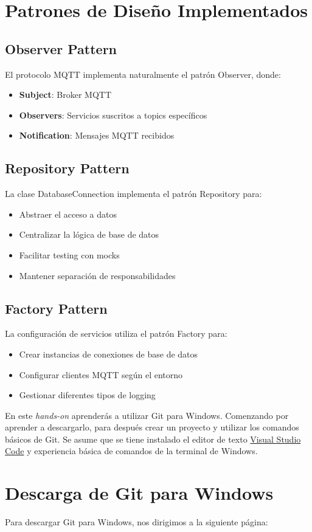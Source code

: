 \section{Patrones de Diseño Implementados}

\subsection{Observer Pattern}
El protocolo MQTT implementa naturalmente el patrón Observer, donde:
\begin{itemize}[noitemsep]
    \item \textbf{Subject}: Broker MQTT
    \item \textbf{Observers}: Servicios suscritos a topics específicos
    \item \textbf{Notification}: Mensajes MQTT recibidos
\end{itemize}

\subsection{Repository Pattern}
La clase DatabaseConnection implementa el patrón Repository para:
\begin{itemize}[noitemsep]
    \item Abstraer el acceso a datos
    \item Centralizar la lógica de base de datos
    \item Facilitar testing con mocks
    \item Mantener separación de responsabilidades
\end{itemize}

\subsection{Factory Pattern}
La configuración de servicios utiliza el patrón Factory para:
\begin{itemize}[noitemsep]
    \item Crear instancias de conexiones de base de datos
    \item Configurar clientes MQTT según el entorno
    \item Gestionar diferentes tipos de logging
\end{itemize}
\vspace{-2em}
En este \emph{hands-on} aprenderás a utilizar Git para Windows. Comenzando por aprender a descargarlo, para después crear un proyecto y utilizar los comandos básicos de Git. Se asume que se tiene instalado el editor de texto \href{https://code.visualstudio.com/download}{ Visual Studio Code} y experiencia básica de comandos de la terminal de Windows.

\section{Descarga de Git para Windows}

Para descargar Git para Windows, nos dirigimos a la siguiente página:
